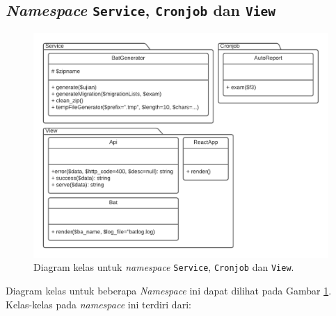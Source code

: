 \subsection{\textit{Namespace} \texttt{Service}, \texttt{Cronjob} dan
\texttt{View}}
    \begin{figure}[hb]
        \centering
        \includegraphics[width=0.75\paperwidth]{Gambar/classmap-be/Classmap - app-service,cronjob,view.pdf}
        \caption{Diagram kelas untuk \textit{namespace} \texttt{Service},
            \texttt{Cronjob} dan \texttt{View}.}
        \label{fig:classmap_app-service,cronjob,view}
    \end{figure}
    Diagram kelas untuk beberapa \textit{Namespace} ini dapat dilihat pada
    Gambar \ref{fig:classmap_app-service,cronjob,view}. Kelas-kelas pada
    \textit{namespace} ini terdiri dari:
